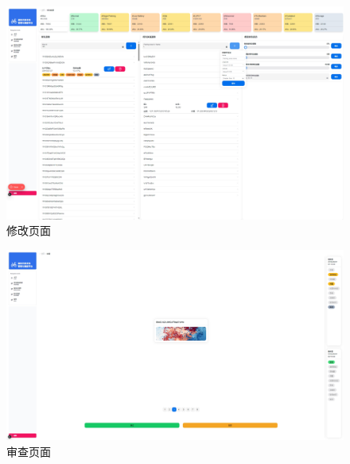 \begin{figure}[!htbp]
    \centering
    \includegraphics[width=\textwidth]{figures/modify.png}
    \caption{修改页面}\label{modify}
\end{figure}

\begin{figure}[!htbp]
    \centering
    \includegraphics[width=\textwidth]{figures/review.png}
    \caption{审查页面}\label{reviewPage}
\end{figure}
